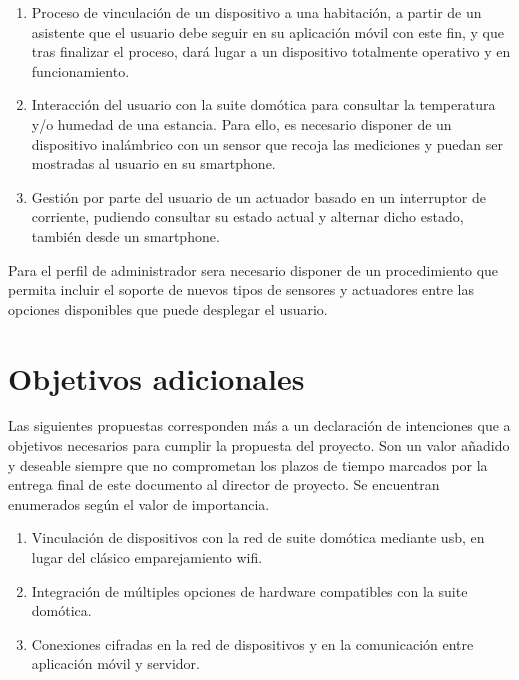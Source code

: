 \begin{enumerate}

    \item Proceso de vinculación de un dispositivo a una habitación, a partir de un asistente que el usuario debe seguir en su aplicación móvil con este fin, y que tras finalizar el proceso, dará lugar a un dispositivo totalmente operativo y en funcionamiento.
    
    \item Interacción del usuario con la suite domótica para consultar la temperatura y/o humedad de una estancia. Para ello, es necesario disponer de un dispositivo inalámbrico con un sensor que recoja las mediciones y puedan ser mostradas al usuario en su smartphone.
    
    \item Gestión por parte del usuario de un actuador basado en un interruptor de corriente, pudiendo consultar su estado actual y alternar dicho estado, también desde un smartphone.

\end{enumerate}

Para el perfil de administrador sera necesario disponer de un procedimiento que permita incluir el soporte de nuevos tipos de sensores y actuadores entre las opciones disponibles que puede desplegar el usuario.

\section{Objetivos adicionales}
\label{ch:Capitulo3.2}

Las siguientes propuestas corresponden más a un declaración de intenciones que a objetivos necesarios para cumplir la propuesta del proyecto. Son un valor añadido y deseable siempre que no comprometan los plazos de tiempo marcados por la entrega final de este documento al director de proyecto. Se encuentran enumerados según el valor de importancia.

\begin{enumerate}

  \item Vinculación de dispositivos con la red de suite domótica mediante \gls{usb}, en lugar del clásico emparejamiento \gls{wifi}.

  \item Integración de múltiples opciones de hardware compatibles con la suite domótica.

  \item Conexiones cifradas en la red de dispositivos y en la comunicación entre aplicación móvil y servidor.

\end{enumerate}
